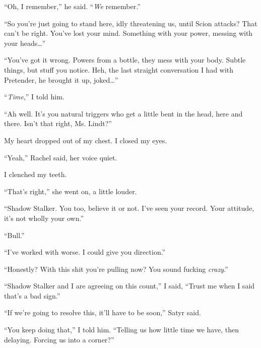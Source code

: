 ``Oh, I remember,'' he said.  ``\emph{We }remember.''



``So you're just going to stand here, idly threatening us, until Scion attacks?  That can't be right.  You've lost your mind.  Something with your power, messing with your heads\ldots''



``You've got it wrong.  Powers from a bottle, they mess with your body.  Subtle things, but stuff you notice.  Heh, the last straight conversation I had with Pretender, he brought it up, joked\ldots''



``\emph{Time},'' I told him.



``Ah well.  It's you natural triggers who get a little bent in the head, here and there.  Isn't that right, Ms. Lindt?''



My heart dropped out of my chest.  I closed my eyes.



``Yeah,'' Rachel said, her voice quiet.



I clenched my teeth.



``That's right,'' she went on, a little louder.



``Shadow Stalker.  You too, believe it or not.  I've seen your record.  Your attitude, it's not wholly your own.''



``Bull.''



``I've worked with worse.  I could give you direction.''



``Honestly?  With this shit you're pulling now?  You sound fucking \emph{crazy}.''



``Shadow Stalker and I are agreeing on this count,'' I said, ``Trust me when I said that's a bad sign.''



``If we're going to resolve this, it'll have to be soon,'' Satyr said.



``You keep doing that,'' I told him.  ``Telling us how little time we have, then delaying.  Forcing us into a corner?''



